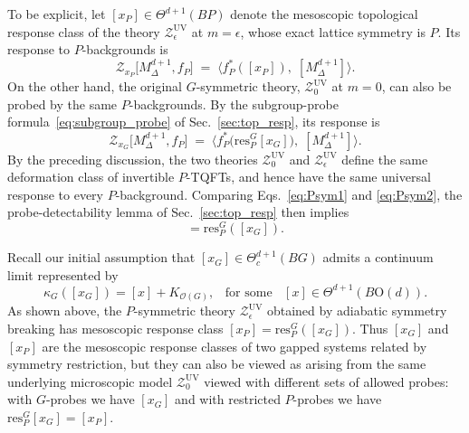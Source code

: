 \documentclass[aps,prx,reprint,superscriptaddress,twocolumn,amsmath,amssymb,amsfonts, nofootinbib]{revtex4-2}
\newcommand{\res}{\text{res}}
\theoremstyle{apsstyle}
\begin{document}
To be explicit, let $[x_P]\in \Theta^{d+1}(BP)$ denote the mesoscopic topological response class of the theory $\mathcal{Z}_{\epsilon}^{\mathrm{UV}}$ at $m=\epsilon$, whose exact lattice symmetry is $P$. Its response to $P$-backgrounds is 
\begin{equation}
    \mathcal{Z}_{x_P}\bigl[M^{d+1}_{\Delta}, f_{P}\bigr]
    \;=\;
    \big\langle f_{P}^{*}\left([x_P]\right),\; [M^{d+1}_{\Delta}]\big\rangle.
    \label{eq:Psym1}
\end{equation} 
On the other hand, the original $G$-symmetric theory, $\mathcal{Z}^{\mathrm{UV}}_{0}$ at $m=0$, can also be probed by the same $P$-backgrounds. By the subgroup-probe formula~\eqref{eq:subgroup_probe} of Sec.~\ref{sec:top_resp}, its response is
\begin{equation}
    \mathcal{Z}_{x_{G}}\bigl[M^{d+1}_{\Delta}, f_{P}\bigr]
    \;=\;
    \big\langle f_{P}^{*}\bigl(\res^{G}_{P} [x_{G}]\bigr),\; [M^{d+1}_{\Delta}]\big\rangle.
    \label{eq:Psym2}
\end{equation}
By the preceding discussion, the two theories $\mathcal{Z}_{0}^{\mathrm{UV}}$ and $\mathcal{Z}_{\epsilon}^{\mathrm{UV}}$ define the same deformation class of invertible $P$-TQFTs, and hence have the same universal response to every $P$-background. Comparing Eqs.~\eqref{eq:Psym1} and \eqref{eq:Psym2}, the probe-detectability lemma of Sec.~\ref{sec:top_resp} then implies
\begin{equation*}
    [x_{P}]=\res^{G}_{P}([x_{G}]).
\end{equation*}

Recall our initial assumption that $[x_G]\in\Theta^{d+1}_{c}(BG)$ admits a continuum limit represented by
\begin{equation*}
\kappa_G([x_G])=[x]+ K_{\mathcal{O}(G)},
\;\;\;
\text{for some }\;\; [x]\in \Theta^{d+1}(B\mathrm{O}(d)).
\end{equation*}
As shown above, the $P$-symmetric theory $\mathcal{Z}_{\epsilon}^{\mathrm{UV}}$ obtained by adiabatic symmetry breaking has mesoscopic response class $[x_P]=\res^G_P([x_G])$. Thus $[x_G]$ and $[x_P]$ are the mesoscopic response classes of two gapped systems related by symmetry restriction, but they can also be viewed as arising from the same underlying microscopic model $\mathcal{Z}_{0}^{\mathrm{UV}}$ viewed with different sets of allowed probes: with $G$-probes we have $[x_{G}]$ and with restricted $P$-probes we have $\res^{G}_{P}[x_{G}]=[x_{P}]$.

\bigskip 
\end{document}
